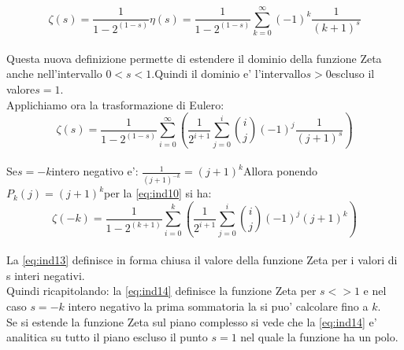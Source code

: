 \documentclass[12pt,a4paper]{article}
\begin{document}
\begin{flushleft}
\begin{equation}
\label{eq:ind12}
\zeta(s)=\frac{1}{1-2^{(1-s)}}\eta(s)=\frac{1}{1-2^{(1-s)}}\sum_{k=0}^{\infty}{(-1)^{k}\frac{1}{{(k+1)}^{s}}}
\end{equation}
\\
\vspace{5mm}
Questa nuova definizione permette di estendere il dominio della funzione Zeta anche nell'intervallo $0<s<1$.\hspace{1mm}Quindi il dominio e' l'intervallo\hspace{1mm}$s>0$\hspace{1mm}escluso il valore\hspace{1mm}$s=1$.\\
\vspace{5mm}
Applichiamo ora la trasformazione di Eulero:\\
\begin{equation}
\label{eq:ind14}
\zeta(s)=\frac{1}{1-2^{(1-s)}}\sum_{i=0}^{\infty}({\frac{1}{2^{i+1}}\sum_{j=0}^{i}{\binom{i}{j}(-1)^{j}\frac{1}{(j+1)^s}}})
\end{equation}
\\
\vspace{5mm}
Se\hspace{5mm}$s=-k$\hspace{5mm}intero negativo e': $\frac{1}{(j+1)^{-k}}=(j+1)^{k}$\hspace{5mm}Allora ponendo\hspace{5mm}$P_{k}(j)=(j+1)^{k}$\hspace{5mm}per la \eqref{eq:ind10} si ha:\\
\begin{equation}
\label{eq:ind13}
\zeta(-k)=\frac{1}{1-2^{(k+1)}}\sum_{i=0}^{k}({\frac{1}{2^{i+1}}\sum_{j=0}^{i}{\binom{i}{j}(-1)^{j}(j+1)^k}})
\end{equation}
\\
\vspace{5mm}
La \eqref{eq:ind13} definisce in forma chiusa il valore della funzione Zeta  per i valori di s interi negativi.\\
\vspace{5mm}
Quindi ricapitolando: la \eqref{eq:ind14} definisce la funzione Zeta per $s<>1$ e nel caso $s=-k$ intero negativo la prima sommatoria la si puo' calcolare fino a $k$.\\
\vspace{5mm}
Se si estende la funzione Zeta sul piano complesso si vede che la  \eqref{eq:ind14} e' analitica su tutto il piano escluso il punto $s=1$ nel quale la funzione ha un polo.\\

\end{flushleft}
\end{document}
